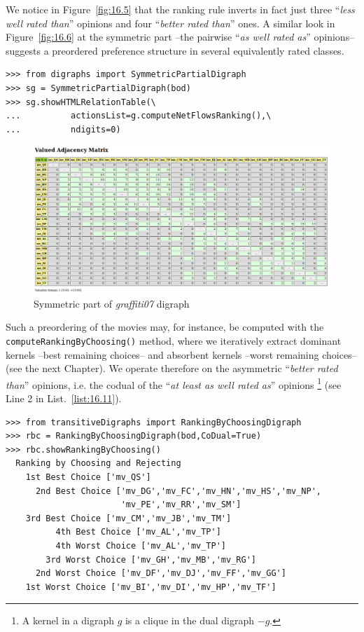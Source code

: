 We notice in Figure~\vref{fig:16.5} that the \NetFlows ranking rule inverts in fact just three ``\emph{less well rated than}'' opinions and four ``\emph{better rated than}'' ones. A similar look in Figure~\vref{fig:16.6} at the symmetric part --the pairwise ``\emph{as well rated as}'' opinions-- suggests a preordered preference structure in several equivalently rated classes. 
\begin{lstlisting}
>>> from digraphs import SymmetricPartialDigraph
>>> sg = SymmetricPartialDigraph(bod)
>>> sg.showHTMLRelationTable(\
...          actionsList=g.computeNetFlowsRanking(),\
...          ndigits=0)
\end{lstlisting}
\begin{figure}[ht]
\includegraphics[width=\hsize]{Figures/16-6-symmetricPart.png}
\caption{Symmetric part of \emph{graffiti07} digraph}
\label{fig:16.6}       %
\end{figure}

Such a preordering of the movies may, for instance, be computed with the \texttt{compute\-RankingByChoosing()} method, where we iteratively extract dominant kernels --best remaining choices-- and absorbent kernels --worst remaining choices-- (see the next Chapter). We operate therefore on the asymmetric ``\emph{better rated than}'' opinions, i.e. the codual of the ``\emph{at least as well rated as}'' opinions \footnote{A kernel in a digraph $g$ is a clique in the dual digraph $-g$.} (see Line 2 in List.~\vref{list:16.11}).
\begin{lstlisting}[caption={Bipolar ranking-by-choosing the Grafitti movies},label=list:16.11]
>>> from transitiveDigraphs import RankingByChoosingDigraph
>>> rbc = RankingByChoosingDigraph(bod,CoDual=True)
>>> rbc.showRankingByChoosing()
  Ranking by Choosing and Rejecting
    1st Best Choice ['mv_QS']
      2nd Best Choice ['mv_DG','mv_FC','mv_HN','mv_HS','mv_NP',
                       'mv_PE','mv_RR','mv_SM']
	3rd Best Choice ['mv_CM','mv_JB','mv_TM']
          4th Best Choice ['mv_AL','mv_TP']
          4th Worst Choice ['mv_AL','mv_TP']
        3rd Worst Choice ['mv_GH','mv_MB','mv_RG']
      2nd Worst Choice ['mv_DF','mv_DJ','mv_FF','mv_GG']
    1st Worst Choice ['mv_BI','mv_DI','mv_HP','mv_TF']
\end{lstlisting}


